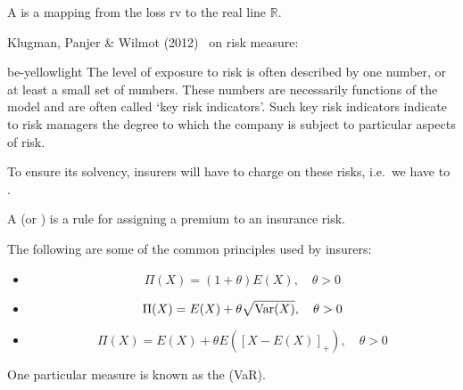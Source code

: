 \documentclass[notoc,notitlepage]{tufte-book}
\begin{document}
\begin{defn}\label{defn:risk_measure}
  A  is a mapping from the loss rv to the real line $\mathbb{R}$.
\end{defn}

Klugman, Panjer \& Wilmot (2012)~\cite{KlugmanPanjerWillmot2012} on risk measure:

\begin{quotebox}{be-yellow}{light}
  The level of exposure to risk is often described by one number, or at least a small set of numbers. These numbers are necessarily functions of the model and are often called ‘key risk indicators’. Such key risk indicators indicate to risk managers the degree to which the company is subject to particular aspects of risk.
\end{quotebox}

To ensure its solvency, insurers will have to charge on these risks, i.e.\ we have to .

\begin{defn}\label{defn:premium_principle}
  A  (or ) is a rule for assigning a premium to an insurance risk.
\end{defn}

\begin{note}
  The following are some of the common principles used by insurers:
  \begin{itemize}
    \item {}
      \begin{equation*}
        \Pi(X) = ( 1 + \theta ) E(X), \quad \theta > 0
      \end{equation*}
    \item {}
      \begin{equation*}
        \Pi(X) = E(X) + \theta \sqrt{\operatorname{Var}(X)}, \quad \theta > 0
      \end{equation*}
    \item {}
      \begin{equation*}
        \Pi(X) = E(X) + \theta E( {[ X - E(X) ]}_+ ), \quad \theta > 0
      \end{equation*}
  \end{itemize}
\end{note}

One particular measure is known as the  (VaR).
\end{document}
